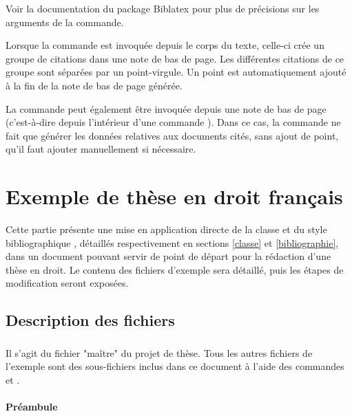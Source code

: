 \documentclass{ltxdockit}
\newcommand*{\biblatex}{Biblatex\xspace}
\newcommand*{\classname}{droit-fr\xspace}
\newcommand*{\bibstylename}{droit-fr\xspace}
\begin{document}
\begin{ltxsyntax}
Voir la documentation du package \biblatex pour plus de précisions sur les arguments de la commande.

Lorsque la commande est invoquée depuis le corps du texte, celle-ci crée un groupe de citations dans une note de bas de page. Les différentes citations de ce groupe sont séparées par un point-virgule. Un point est automatiquement ajouté à la fin de la note de bas de page générée.

La commande peut également être invoquée depuis une note de bas de page (c'est-à-dire depuis l'intérieur d'une commande ). Dans ce cas, la commande  ne fait que générer les données relatives aux documents cités, sans ajout de point, qu'il faut ajouter manuellement si nécessaire.

\end{ltxsyntax}


\section{Exemple de thèse en droit français}
\label{template}

Cette partie présente une mise en application directe de la classe \sty{\classname} et du style bibliographique \sty{\bibstylename}, détaillés respectivement en sections \ref{classe} et \ref{bibliographie}, dans un document \latex pouvant servir de point de départ pour la rédaction d'une thèse en droit. Le contenu des fichiers d'exemple sera détaillé, puis les étapes de modification seront exposées.

\subsection{Description des fichiers}

\subsubsection{}

Il s'agit du fichier "ma\^itre" du projet de thèse. Tous les autres fichiers de l'exemple sont des sous-fichiers inclus dans ce document à l'aide des commandes  et .

\paragraph{Préambule}
\end{document}

